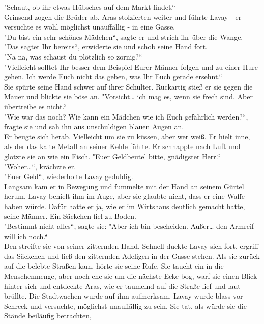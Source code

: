 "Schaut, ob ihr etwas Hübsches auf dem Markt findet.``\\
Grinsend zogen die Brüder ab. Aras stolzierten weiter und führte Lavay - er versuchte es wohl 
möglichst unauffällig - in eine Gasse.\\
"Du bist ein sehr schönes Mädchen``, sagte er und strich ihr über die Wange.\\
"Das sagtet Ihr bereits``, erwiderte sie und schob seine Hand fort.\\
"Na na, was schaust du plötzlich so zornig?``\\
"Vielleicht solltet Ihr besser dem Beispiel Eurer Männer folgen und zu einer Hure gehen. Ich werde 
Euch nicht das geben, was Ihr Euch gerade ersehnt.``\\
Sie spürte seine Hand schwer auf ihrer Schulter. Ruckartig stieß er sie gegen die Mauer und blickte 
sie böse an. "Vorsicht… ich mag es, wenn sie frech sind. Aber übertreibe es nicht.``\\
"Wie war das noch? Wie kann ein Mädchen wie ich Euch gefährlich werden?``, fragte sie und sah ihn 
aus unschuldigen blauen Augen an.\\
Er beugte sich herab. Vielleicht um sie zu küssen, aber wer weiß. Er hielt inne, als der das kalte 
Metall an seiner Kehle fühlte. Er schnappte nach Luft und glotzte sie an wie ein Fisch. "Euer 
Geldbeutel bitte, gnädigster Herr.``\\
"Woher…``, krächzte er.\\
"Euer Geld``, wiederholte Lavay geduldig.\\
Langsam kam er in Bewegung und fummelte mit der Hand an seinem Gürtel herum. Lavay behielt ihm im 
Auge, aber sie glaubte nicht, dass er eine Waffe haben würde. Dafür hatte er ja, wie er im 
Wirtshaus deutlich gemacht hatte, seine Männer. Ein Säckchen fiel zu Boden.\\
"Bestimmt nicht alles``, sagte sie: "Aber ich bin bescheiden. Außer… den Armreif will ich noch.``\\
Den streifte sie von seiner zitternden Hand. Schnell duckte Lavay sich fort, ergriff das Säckchen 
und ließ den zitternden Adeligen in der Gasse stehen. Als sie zurück auf die belebte Straßen kam, 
hörte sie seine Rufe. Sie taucht ein in die Menschenmenge, aber noch ehe sie um die nächste Ecke 
bog, warf sie einen Blick hinter sich und entdeckte Aras, wie er taumelnd auf die Straße lief und 
laut brüllte. Die Stadtwachen wurde auf ihm aufmerksam. Lavay wurde blass vor Schreck und 
versuchte, möglichst unauffällig zu sein. Sie tat, als würde sie die Stände beiläufig betrachten, 
